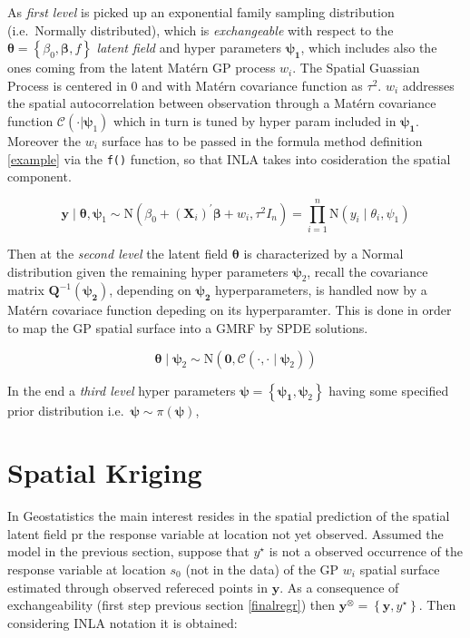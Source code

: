 \documentclass[
  12pt,
  a4paper,
  oneside]{book}
\begin{document}
As \emph{first level} is picked up an exponential family sampling distribution (i.e.~Normally distributed), which is \emph{exchangeable} with respect to the \(\boldsymbol{\theta}=\left\{\beta_{0}, \boldsymbol{\beta}, f\right\}\) \emph{latent field} and hyper parameters \(\boldsymbol{\psi_{1}}\), which includes also the ones coming from the latent Matérn GP process \(w_{i}\). The Spatial Guassian Process is centered in 0 and with Matérn covariance function as \(\tau^2\). \(w_{i}\) addresses the spatial autocorrelation between observation through a Matérn covariance function \(\mathcal{C}(\cdot | \boldsymbol\psi_{1})\) which in turn is tuned by hyper param included in \(\boldsymbol{\psi_1}\). Moreover the \(w_{i}\) surface has to be passed in the formula method definition \ref{example} via the \texttt{f()} function, so that INLA takes into cosideration the spatial component.

\[
\boldsymbol{y} \mid \boldsymbol{\theta}, \boldsymbol{\psi}_{1} \sim \mathrm{N}\left(\beta_{0}+ (\mathbf{X}_{i})^{\prime}\boldsymbol{\beta} + w_{i} ,  \tau^2 I_{n}\right)=\prod_{i=1}^{n} \mathrm{N}\left(y_{i} \mid \theta_{i}, \psi_{1}\right)
\]

Then at the \emph{second level} the latent field \(\boldsymbol{\theta}\) is characterized by a Normal distribution given the remaining hyper parameters \(\boldsymbol{\psi}_2\), recall the covariance matrix \(\boldsymbol{Q}^{-1}(\boldsymbol{\psi_{2}})\), depending on \(\boldsymbol{\psi_{2}}\) hyperparameters, is handled now by a Matérn covariace function depeding on its hyperparamter. This is done in order to map the GP spatial surface into a GMRF by SPDE solutions.

\[
\boldsymbol{\theta} \mid \boldsymbol{\psi}_{2} \sim \mathrm{N}\left(\boldsymbol{0}, \mathcal{C}( \cdot , \cdot  \mid \boldsymbol{\psi}_{2})\right)
\]

In the end a \emph{third level} hyper parameters \(\boldsymbol{\psi}=\left\{\boldsymbol{\psi_{1}}, \boldsymbol{\psi}_{2}\right\}\) having some specified prior distribution i.e.~\(\boldsymbol{\psi} \sim \pi(\boldsymbol{\psi})\),

\hypertarget{spatial-kriging}{%
\section{Spatial Kriging}\label{spatial-kriging}}

In Geostatistics the main interest resides in the spatial prediction of the spatial latent field pr the response variable at location not yet observed.
Assumed the model in the previous section, suppose that \(y^{\star}\) is not a observed occurrence of the response variable at location \(s_{0}\) (not in the data) of the GP \(w_{i}\) spatial surface estimated through observed refereced points in \(\boldsymbol{y}\). As a consequence of exchangeability (first step previous section \ref{finalregr}) then \(\boldsymbol{y}^{\otimes}=\left\{\boldsymbol{y}, y^{\star}\right\}\). Then considering INLA notation it is obtained:
\end{document}
